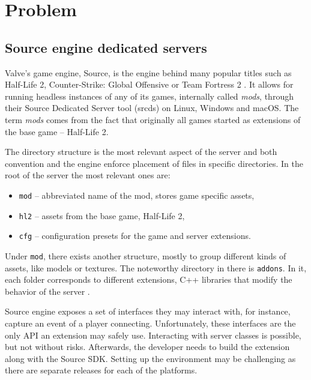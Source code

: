 \chapter{Problem}

\section{Source engine dedicated servers}

Valve's game engine, Source, is the engine behind many popular titles such as Half-Life 2, Counter-Strike: Global Offensive or Team Fortress 2 \cite{valve-source}.
It allows for running headless instances of any of its games, internally called \textit{mods}, through their Source Dedicated Server tool (srcds) on Linux, Windows and macOS\@.
The term \textit{mods} comes from the fact that originally all games started as extensions of the base game -- Half-Life 2.

The directory structure is the most relevant aspect of the server and both convention and the engine enforce placement of files in specific directories.
In the root of the server the most relevant ones are:

\begin{itemize}
    \item \verb|mod| -- abbreviated name of the mod, stores game specific assets,
    \item \verb|hl2| -- assets from the base game, Half-Life 2,
    \item \verb|cfg| -- configuration presets for the game and server extensions.
\end{itemize}

Under \verb|mod|, there exists another structure, mostly to group different kinds of assets, like models or textures.
The noteworthy directory in there is \verb|addons|.
In it, each folder corresponds to different extensions, C++ libraries that modify the behavior of the server \cite{server-plugins}.

Source engine exposes a set of interfaces they may interact with, for instance, capture an event of a player connecting.
Unfortunately, these interfaces are the only API an extension may safely use.
Interacting with server classes is possible, but not without risks.
Afterwards, the developer needs to build the extension along with the Source SDK\@.
Setting up the environment may be challenging as there are separate releases for each of the platforms.

